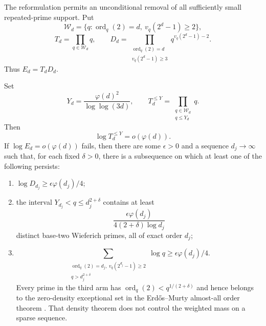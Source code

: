The reformulation permits an unconditional removal of all sufficiently
small repeated-prime support.  Put
\[
 \mathcal W_d=\{q:\operatorname{ord}_q(2)=d,
                    \ v_q(2^d-1)\ge2\},
\]
\[
 T_d=\prod_{q\in\mathcal W_d}q,\qquad
 D_d=\prod_{\substack{\operatorname{ord}_q(2)=d\\v_q(2^d-1)\ge3}}
              q^{v_q(2^d-1)-2}.
\]
Thus $E_d=T_dD_d$.

\begin{proposition}
\label{prop:mersenne-near-quadratic-tail}
Set
\[
 Y_d=\frac{\varphi(d)^2}{\log\log(3d)},\qquad
 T_d^{\le Y}=\prod_{\substack{q\in\mathcal W_d\\q\le Y_d}}q.
\]
Then
\begin{equation}\label{eq:mersenne-small-wieferich-mass}
                   \log T_d^{\le Y}=o(\varphi(d)).
\end{equation}
If $\log E_d=o(\varphi(d))$ fails, then there are some $\epsilon>0$ and a
sequence $d_j\to\infty$ such that, for each fixed $\delta>0$, there is a
subsequence on which at least one of the following persists:
\begin{enumerate}
\item $\log D_{d_j}\ge\epsilon\varphi(d_j)/4$;
\item the interval $Y_{d_j}<q\le d_j^{2+\delta}$ contains at least
\[
 \frac{\epsilon\varphi(d_j)}{4(2+\delta)\log d_j}
\]
distinct base-two Wieferich primes, all of exact order $d_j$;
\item
\[
 \sum_{\substack{\operatorname{ord}_q(2)=d_j,
                  \ v_q(2^{d_j}-1)\ge2\\q>d_j^{2+\delta}}}
       \log q\ge\epsilon\varphi(d_j)/4.
\]
Every prime in the third arm has
$\operatorname{ord}_q(2)<q^{1/(2+\delta)}$ and hence belongs to the
zero-density exceptional set in the Erd\H{o}s--Murty almost-all order
theorem \cite{ErdosMurty1999}.  That density theorem does not control the
weighted mass on a sparse sequence.
\end{enumerate}
\end{proposition}

